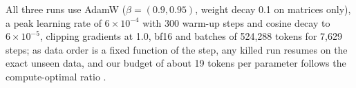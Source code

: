 \documentclass[11pt, oneside]{article}
\begin{document}
All three runs use AdamW \cite{loshchilov2019adamw} ($\beta=(0.9,0.95)$, weight decay 0.1 on matrices only), a peak learning rate of $6\times10^{-4}$ with 300 warm-up steps and cosine decay to $6\times10^{-5}$, clipping gradients at 1.0, bf16 and batches of 524,288 tokens for 7,629 steps; as data order is a fixed function of the step, any killed run resumes on the exact unseen data, and our budget of about 19 tokens per parameter follows the compute-optimal ratio \cite{hoffmann2022chinchilla}.

\begin{table}[H]
\centering\small
\setlength{\tabcolsep}{4pt}
\caption{Final Phase 1 models, all trained on the same 4.0B tokens. The encoder's masked-LM loss is not comparable with the causal losses.}
\label{tab:arch}
\end{table}
\end{document}
